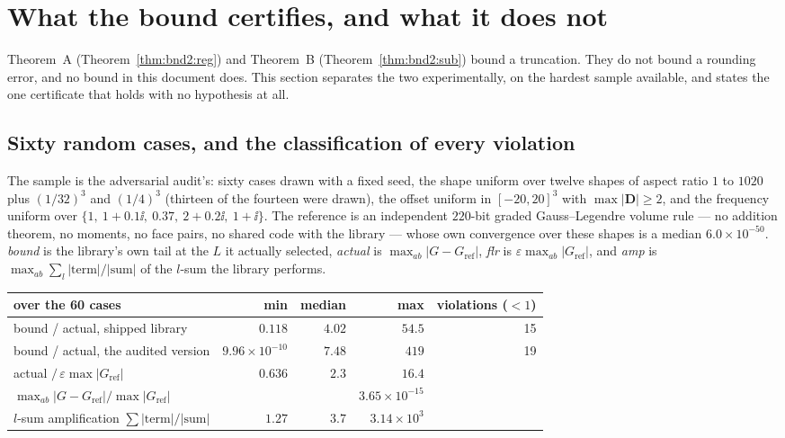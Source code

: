 \section{What the bound certifies, and what it does not}
\label{sec:bnd:cert}

Theorem~A (Theorem~\ref{thm:bnd2:reg}) and Theorem~B (Theorem~\ref{thm:bnd2:sub}) bound a
truncation. They do
not bound a rounding error, and no bound in this document does. This section separates the
two experimentally, on the hardest sample available, and states the one certificate that
holds with no hypothesis at all.

\subsection{Sixty random cases, and the classification of every violation}
\label{sec:bnd:cert:60}

The sample is the adversarial audit's: sixty cases drawn with a fixed seed, the shape
uniform over twelve shapes of aspect ratio $1$ to $1020$ plus $(1/32)^3$ and $(1/4)^3$
(thirteen of the fourteen were drawn), the offset uniform in $[-20,20]^3$ with
$\max|\mathbf{D}| \ge 2$, and the frequency uniform over
$\{1,\ 1+0.1\ii,\ 0.37,\ 2+0.2\ii,\ 1+\ii\}$. The reference is an independent $220$-bit
graded Gauss--Legendre volume rule --- no addition theorem, no moments, no face pairs, no
shared code with the library --- whose own convergence over these shapes is a median
$6.0\times10^{-50}$. \emph{bound} is the library's own tail at the $L$ it actually selected,
\emph{actual} is $\max_{ab}|G - G_{\mathrm{ref}}|$, \emph{flr} is
$\varepsilon\max_{ab}|G_{\mathrm{ref}}|$, and \emph{amp} is
$\max_{ab}\sum_l|\text{term}|/|\text{sum}|$ of the $l$-sum the library performs.

\begin{center}\small
\begin{tabular}{@{}lrrrr@{}}
\toprule
over the 60 cases & min & median & max & violations ($<1$)\\
\midrule
bound / actual, shipped library & $0.118$ & $4.02$ & $54.5$ & 15\\
bound / actual, the audited version & $9.96\times10^{-10}$ & $7.48$ & $419$ & 19\\
\midrule
actual $/\,\varepsilon\max|G_{\mathrm{ref}}|$ & $0.636$ & $2.3$ & $\mathbf{16.4}$ & \\
$\max_{ab}|G-G_{\mathrm{ref}}|/\max|G_{\mathrm{ref}}|$ & & & $3.65\times10^{-15}$ & \\
$l$-sum amplification $\sum|\text{term}|/|\text{sum}|$ & $1.27$ & $3.7$ &
$3.14\times10^{3}$ & \\
\bottomrule
\end{tabular}
\end{center}

